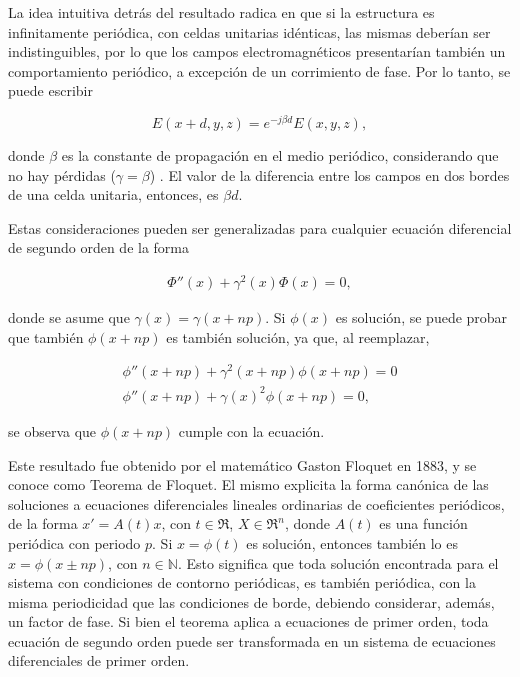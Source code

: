 La idea intuitiva detrás del resultado radica en que si la estructura es infinitamente periódica, con celdas unitarias idénticas, las mismas deberían ser indistinguibles, por lo que los campos electromagnéticos presentarían también un comportamiento periódico, a excepción de un corrimiento de fase. Por lo tanto, se puede escribir

\begin{equation}
\label{eq:comportamiento-periodico-campo-bloch}
E(x+d,y,z) = e^{-j \beta d} E(x,y,z),
\end{equation}

donde $\beta$ es la constante de propagación en el medio periódico, considerando que no hay pérdidas ($\gamma = \beta$) \cite{Capolino:TheoryPhenomenaMetamaterials}. El valor de la diferencia entre los campos en dos bordes de una celda unitaria, entonces, es $\beta d$.

Estas consideraciones pueden ser generalizadas para cualquier ecuación diferencial de segundo orden de la forma

\begin{align}
\Phi'' (x) + \gamma^2(x) \Phi(x) = 0,
\end{align}

donde se asume que $\gamma(x) = \gamma(x+np)$. Si $\phi(x)$ es solución, se puede probar que también $\phi(x+np)$ es también solución, ya que, al reemplazar,

\begin{align}
\phi'' (x+np) + \gamma^2(x+np) \phi(x+np) = 0 \\
\phi'' (x+np) + \gamma(x)^2 \phi(x+np) = 0,
\end{align}

se observa que $\phi(x+np)$ cumple con la ecuación.

Este resultado fue obtenido por el matemático Gaston Floquet en 1883, y se conoce como Teorema de Floquet. El mismo explicita la forma canónica de las soluciones a ecuaciones diferenciales lineales ordinarias de coeficientes periódicos, de la forma $x' = A(t)x$, con $t \in \Re$, $X \in \Re^n$, donde $A(t)$ es una función periódica con periodo $p$. Si $x=\phi(t)$ es solución, entonces también lo es $x=\phi(x\pm np)$, con $n \in \mathbb{N}$. Esto significa que toda solución encontrada para el sistema con condiciones de contorno periódicas, es también periódica, con la misma periodicidad que las condiciones de borde, debiendo considerar, además, un factor de fase. Si bien el teorema aplica a ecuaciones de primer orden, toda ecuación de segundo orden puede ser transformada en un sistema de ecuaciones diferenciales de primer orden.

